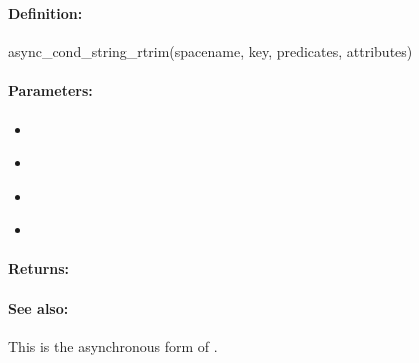 \pagebreak
\subsubsection{}
\label{api:ruby:async_cond_string_rtrim}


\paragraph{Definition:}
\begin{rubycode}
async_cond_string_rtrim(spacename, key, predicates, attributes)
\end{rubycode}

\paragraph{Parameters:}
\begin{itemize}[noitemsep]
\item {}\\

\item {}\\

\item {}\\

\item {}\\

\end{itemize}

\paragraph{Returns:}


\paragraph{See also:}  This is the asynchronous form of .

\pagebreak
\subsubsection{}
\label{api:ruby:group_string_rtrim}


